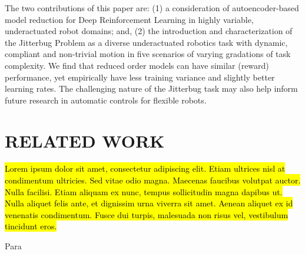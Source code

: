 \documentclass[letterpaper, 10 pt, conference]{ieeeconf}
\begin{document}
The two contributions of this paper are: (1) a consideration of autoencoder-based model reduction for Deep Reinforcement Learning in highly variable, underactuated robot domains; and, (2) the introduction and characterization of the Jitterbug Problem as a diverse underactuated robotics task with dynamic, compliant and non-trivial motion in five scenarios of varying gradations of task complexity.
We find that reduced order models can have similar (reward) performance, yet empirically have less training variance and slightly better learning rates.  
The challenging nature of the Jitterbug task may also help inform future research in automatic controls for flexible robots.

\section{RELATED WORK}

\hl{Lorem ipsum dolor sit amet, consectetur adipiscing elit. Etiam ultrices nisl at condimentum ultricies. Sed vitae odio magna. Maecenas faucibus volutpat auctor. Nulla facilisi. Etiam aliquam ex nunc, tempus sollicitudin magna dapibus ut. Nulla aliquet felis ante, et dignissim urna viverra sit amet. Aenean aliquet ex id venenatis condimentum. Fusce dui turpis, malesuada non risus vel, vestibulum tincidunt eros.}

{Para}













\end{document}
